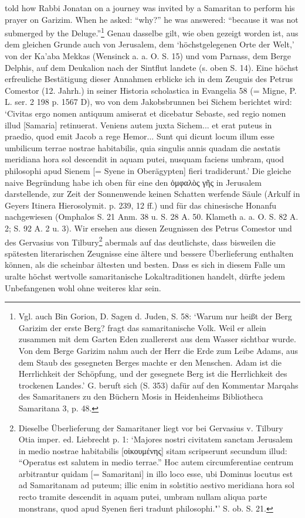 \documentclass[a4paper, 11pt, oneside]{article}
\begin{document}
told how Rabbi Jonatan on a journey was invited by a Samaritan to perform his prayer on Garizim. When he asked: "`why?"' he was answered: "`because it was not submerged by the Deluge."'\footnote{Vgl. auch Bin Gorion, D. Sagen d. Juden, S. 58: `Warum nur heißt der Berg Garizim der erste Berg? fragt das samaritanische Volk. Weil er allein zusammen mit dem Garten Eden zuallererst aus dem Wasser sichtbar wurde. Von dem Berge Garizim nahm auch der Herr die Erde zum Leibe Adams, aus dem Staub des gesegneten Berges machte er den Menschen. Adam ist die Herrlichkeit der Schöpfung, und der gesegnete Berg ist die Herrlichkeit des trockenen Landes.' G. beruft sich (S. 353) dafür auf den Kommentar Marqahs des Samaritaners zu den Büchern Mosis in Heidenheims Bibliotheca Samaritana 3, p. 48.} Genau dasselbe gilt, wie oben gezeigt worden ist, aus dem gleichen Grunde auch von Jerusalem, dem `höchstgelegenen Orte der Welt,' von der Ka'aba Mekkas (Wensinck a. a. O. S. 15) und vom Parnass, dem Berge Delphis, auf dem Deukalion nach der Sintflut landete (s. oben S. 14). Eine höchst erfreuliche Bestätigung dieser Annahmen erblicke ich in dem Zeuguis des Petrus Comestor (12. Jahrh.) in seiner Historia scholastica in Evangelia 58 (= Migne, P. L. ser. 2 198 p. 1567 D), wo von dem Jakobsbrunnen bei Sichem berichtet wird: `Civitas ergo nomen antiquum amiserat et dicebatur Sebaste, sed regio nomen illud [Samaria] retinuerat. Veniens autem juxta Sichem... et erat puteus in praedio, quod emit Jacob a rege Hemor... Sunt qui dicunt locum illum esse umbilicum terrae nostrae habitabilis, quia singulis annis quadam die aestatis meridiana hora sol descendit in aquam putei, nusquam faciens umbram, quod philosophi apud Sienem [= Syene in Oberägypten] fieri tradiderunt.' Die gleiche naive Begründung habe ich oben für eine den ὀμφαλὸς γῆς in Jerusalem darstellende, zur Zeit der Sonnenwende keinen Schatten werfende Säule (Arkulf in Geyers Itinera Hierosolymit. p. 239, 12 ff.) und für das chinesische Honanfu nachgewiesen (Omphalos S. 21 Anm. 38 u. S. 28 A. 50. Klameth a. a. O. S. 82 A. 2; S. 92 A. 2 u. 3). Wir ersehen aus diesen Zeugnissen des Petrus Comestor und des Gervasius von Tilbury\footnote{Dieselbe Überlieferung der Samaritaner liegt vor bei Gervasius v. Tilbury Otia imper. ed. Liebrecht p. 1: `Majores nostri civitatem sanctam Jerusalem in medio nostrae habitabilis [οἰκουμένης] sitam scripserunt secundum illud: "`Operatus est salutem in medio terrae."' Hoc autem circumferentiae centrum arbitrantur quidam [= Samaritani] in illo loco esse, ubi Dominus locutus est ad Samaritanam ad puteum; illic enim in solstitio aestivo meridiana hora sol recto tramite descendit in aquam putei, umbram nullam aliqua parte monstrans, quod apud Syenen fieri tradunt philosophi."' S. ob. S. 21.} abermals auf das deutlichste, dass bisweilen die spätesten literarischen Zeugnisse eine ältere und bessere Überlieferung enthalten können, als die scheinbar ältesten und besten. Dass es sich in diesem Falle um uralte höchst wertvolle samaritanische Lokaltraditionen handelt, dürfte jedem Unbefangenen wohl ohne weiteres klar sein.
\end{document}
